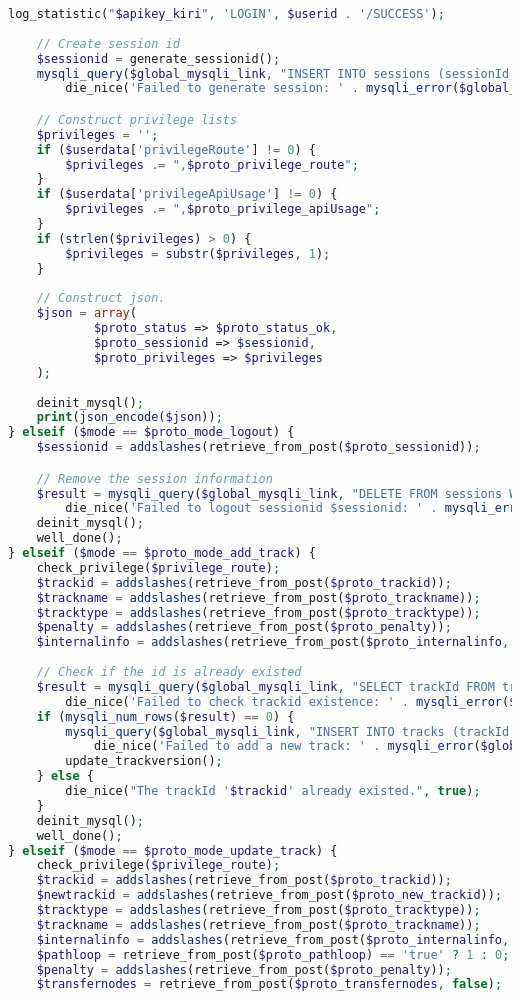 \documentclass[a4paper,twoside]{article}
\begin{document}
\begin{lstlisting}[language=PHP,basicstyle=\tiny,caption=handle.php,label={lst:handle.php}]
	log_statistic("$apikey_kiri", 'LOGIN', $userid . '/SUCCESS');
	
	// Create session id
	$sessionid = generate_sessionid();
	mysqli_query($global_mysqli_link, "INSERT INTO sessions (sessionId, email) VALUES ('$sessionid', '$userid')") or
		die_nice('Failed to generate session: ' . mysqli_error($global_mysqli_link), true);

	// Construct privilege lists
	$privileges = '';
	if ($userdata['privilegeRoute'] != 0) {
		$privileges .= ",$proto_privilege_route";
	}
	if ($userdata['privilegeApiUsage'] != 0) {
		$privileges .= ",$proto_privilege_apiUsage";
	}
	if (strlen($privileges) > 0) {
		$privileges = substr($privileges, 1);
	}
	
	// Construct json.
	$json = array(
			$proto_status => $proto_status_ok,
			$proto_sessionid => $sessionid,
			$proto_privileges => $privileges
	);
	
	deinit_mysql();
	print(json_encode($json));
} elseif ($mode == $proto_mode_logout) {
	$sessionid = addslashes(retrieve_from_post($proto_sessionid));

	// Remove the session information
	$result = mysqli_query($global_mysqli_link, "DELETE FROM sessions WHERE sessionId='$sessionid'") or
		die_nice('Failed to logout sessionid $sessionid: ' . mysqli_error($global_mysqli_link), true);
	deinit_mysql();
	well_done();	
} elseif ($mode == $proto_mode_add_track) {
	check_privilege($privilege_route); 
	$trackid = addslashes(retrieve_from_post($proto_trackid));
	$trackname = addslashes(retrieve_from_post($proto_trackname));
	$tracktype = addslashes(retrieve_from_post($proto_tracktype));
	$penalty = addslashes(retrieve_from_post($proto_penalty));
	$internalinfo = addslashes(retrieve_from_post($proto_internalinfo, false)) or $internalinfo = '';
	
	// Check if the id is already existed
	$result = mysqli_query($global_mysqli_link, "SELECT trackId FROM tracks WHERE trackId='$trackid'") or
		die_nice('Failed to check trackid existence: ' . mysqli_error($global_mysqli_link), true);
	if (mysqli_num_rows($result) == 0) {
		mysqli_query($global_mysqli_link, "INSERT INTO tracks (trackId, trackTypeId, trackName, penalty, internalInfo) VALUES ('$trackid','$tracktype','$trackname','$penalty','$internalinfo')") or
			die_nice('Failed to add a new track: ' . mysqli_error($global_mysqli_link), true);
		update_trackversion();
	} else {
		die_nice("The trackId '$trackid' already existed.", true);
	}
	deinit_mysql();
	well_done();
} elseif ($mode == $proto_mode_update_track) {
	check_privilege($privilege_route);
	$trackid = addslashes(retrieve_from_post($proto_trackid));
	$newtrackid = addslashes(retrieve_from_post($proto_new_trackid));
	$tracktype = addslashes(retrieve_from_post($proto_tracktype));
	$trackname = addslashes(retrieve_from_post($proto_trackname));
	$internalinfo = addslashes(retrieve_from_post($proto_internalinfo, false)) or $internalinfo = '';
	$pathloop = retrieve_from_post($proto_pathloop) == 'true' ? 1 : 0;
	$penalty = addslashes(retrieve_from_post($proto_penalty));
	$transfernodes = retrieve_from_post($proto_transfernodes, false);
	

\end{lstlisting}
\end{document}
